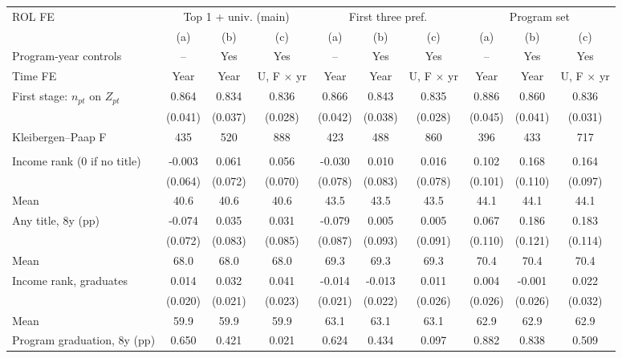 \begin{tabular}{l*{9}{c}}
\toprule
ROL FE & \multicolumn{3}{c}{Top 1 + univ. (main)} & \multicolumn{3}{c}{First three pref.} & \multicolumn{3}{c}{Program set} \\
\cmidrule(lr){2-4}\cmidrule(lr){5-7}\cmidrule(lr){8-10}
 & (a) & (b) & (c) & (a) & (b) & (c) & (a) & (b) & (c) \\
Program-year controls & -- & Yes & Yes & -- & Yes & Yes & -- & Yes & Yes \\
Time FE & Year & Year & U, F \(\times\) yr & Year & Year & U, F \(\times\) yr & Year & Year & U, F \(\times\) yr \\
\midrule
First stage: \(n_{pt}\) on \(Z_{pt}\) & 0.864\sym{***} & 0.834\sym{***} & 0.836\sym{***} & 0.866\sym{***} & 0.843\sym{***} & 0.835\sym{***} & 0.886\sym{***} & 0.860\sym{***} & 0.836\sym{***} \\
 & (0.041) & (0.037) & (0.028) & (0.042) & (0.038) & (0.028) & (0.045) & (0.041) & (0.031) \\
Kleibergen--Paap F &    435 &    520 &    888 &    423 &    488 &    860 &    396 &    433 &    717 \\
\addlinespace
\multicolumn{10}{l}{2SLS, per ten entrants} \\
\quad Income rank (0 if no title) & -0.003 &  0.061 &  0.056 & -0.030 &  0.010 &  0.016 &  0.102 &  0.168 &  0.164\sym{*} \\
 & (0.064) & (0.072) & (0.070) & (0.078) & (0.083) & (0.078) & (0.101) & (0.110) & (0.097) \\
\quad \quad Mean &  40.6 &  40.6 &  40.6 &  43.5 &  43.5 &  43.5 &  44.1 &  44.1 &  44.1 \\
\quad Any title, 8y (pp) & -0.074 &  0.035 &  0.031 & -0.079 &  0.005 &  0.005 &  0.067 &  0.186 &  0.183 \\
 & (0.072) & (0.083) & (0.085) & (0.087) & (0.093) & (0.091) & (0.110) & (0.121) & (0.114) \\
\quad \quad Mean &  68.0 &  68.0 &  68.0 &  69.3 &  69.3 &  69.3 &  70.4 &  70.4 &  70.4 \\
\quad Income rank, graduates &  0.014 &  0.032 &  0.041\sym{*} & -0.014 & -0.013 &  0.011 &  0.004 & -0.001 &  0.022 \\
 & (0.020) & (0.021) & (0.023) & (0.021) & (0.022) & (0.026) & (0.026) & (0.026) & (0.032) \\
\quad \quad Mean &  59.9 &  59.9 &  59.9 &  63.1 &  63.1 &  63.1 &  62.9 &  62.9 &  62.9 \\
\quad Program graduation, 8y (pp) &  0.650\sym{**} &  0.421 &  0.021 &  0.624\sym{*} &  0.434 &  0.097 &  0.882\sym{**} &  0.838\sym{*} &  0.509 \\

\end{tabular}
